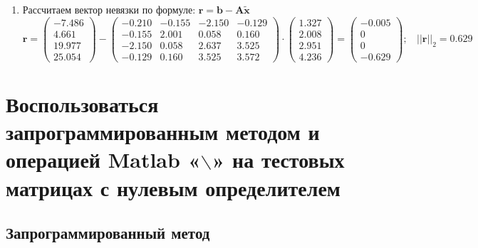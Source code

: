 \begin{enumerate}
    \item Рассчитаем вектор невязки по формуле: $\mathbf{r}=\mathbf{b}-\textbf{A}\widetilde{\mathbf{x}}$
    \[ \mathbf{r}=
    \begin{pmatrix}
        -7.486\\ 4.661\\ 19.977\\ 25.054
    \end{pmatrix} -
    \begin{pmatrix}
        -0.210&-0.155&-2.150&-0.129\\
        -0.155& 2.001& 0.058& 0.160\\
        -2.150& 0.058& 2.637& 3.525\\
        -0.129& 0.160& 3.525& 3.572
    \end{pmatrix} \cdot
    \begin{pmatrix} 1.327 \\ 2.008\\ 2.951\\ 4.236 \end{pmatrix} =
    \begin{pmatrix} -0.005\\ 0\\ 0\\ -0.629 \end{pmatrix}; ~~~~ ||\mathbf{r}||_2 = 0.629 \]
\end{enumerate}

\clearpage
\section{Воспользоваться запрограммированным методом и операцией Matlab «$\backslash$» на тестовых матрицах с нулевым определителем}
\subsection{Запрограммированный метод}

